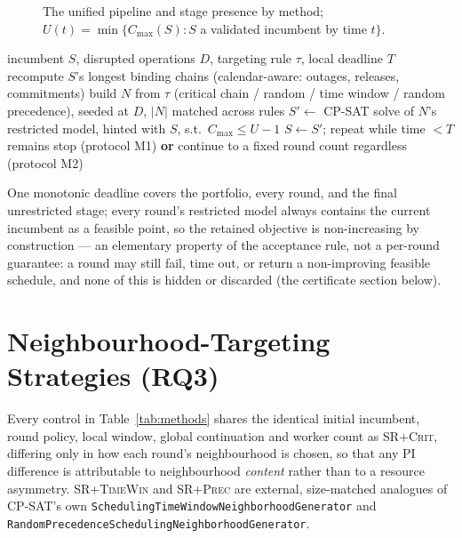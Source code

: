 \documentclass[letterpaper]{article} %
\newcommand{\crit}{\textsc{SR+Crit}}
\newcommand{\tw}{\textsc{SR+TimeWin}}
\newcommand{\precn}{\textsc{SR+Prec}}
\begin{document}
\begin{figure}[t]
\centering
\scalebox{0.92}{}
\caption{The unified pipeline and stage presence by method; $U(t)=\min\{C_{\max}(S): S$ a validated incumbent by time $t\}$.}
\label{fig:framework}
\end{figure}

\begin{algorithm}[t]
\caption{One round of repeated restricted reoptimization}
\label{alg:round}
\begin{algorithmic}[1]
\REQUIRE incumbent $S$, disrupted operations $D$, targeting rule $\tau$, local deadline $T$
\STATE recompute $S$'s longest binding chains (calendar-aware: outages, releases, commitments)
\STATE build $N$ from $\tau$ (critical chain / random / time window / random precedence), seeded at $D$, $|N|$ matched across rules
\STATE $S' \gets$ CP-SAT solve of $N$'s restricted model, hinted with $S$, s.t.\ $C_{\max}\le U{-}1$
  \STATE $S \gets S'$; repeat while time $<T$ remains
\ELSE
  \STATE stop (protocol M1) \textbf{or} continue to a fixed round count regardless (protocol M2)
\ENDIF
\end{algorithmic}
\end{algorithm}

One monotonic deadline covers the portfolio, every round, and the final unrestricted stage; every round's restricted model always contains the current incumbent as a feasible point, so the retained objective is non-increasing by construction --- an elementary property of the acceptance rule, not a per-round guarantee: a round may still fail, time out, or return a non-improving feasible schedule, and none of this is hidden or discarded (the certificate section below).

\section{Neighbourhood-Targeting Strategies (RQ3)}
\label{sec:lns}

Every control in Table~\ref{tab:methods} shares the identical initial incumbent, round policy, local window, global continuation and worker count as \crit{}, differing only in how each round's neighbourhood is chosen, so that any PI difference is attributable to neighbourhood \emph{content} rather than to a resource asymmetry. \tw{} and \precn{} are external, size-matched analogues of CP-SAT's own \texttt{Scheduling\-Time\-Window\-Neighborhood\-Generator} and \texttt{Random\-Precedence\-Scheduling\-Neighborhood\-Generator}.
\end{document}
